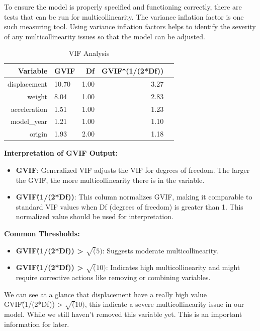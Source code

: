To ensure the model is properly specified and functioning correctly, there are tests that can be run for multicollinearity. The variance inflation factor is one such measuring tool. Using variance inflation factors helps to identify the severity of any multicollinearity issues so that the model can be adjusted.

\begin{table}[H]
\centering
\begin{tabular}{rlrrr}
  \hline
 Variable & GVIF & Df & GVIF\verb|^|(1/(2*Df)) \\ 
  \hline
displacement & 10.70 & 1.00 & 3.27 \\ 
weight & 8.04 & 1.00 & 2.83 \\ 
 acceleration & 1.51 & 1.00 & 1.23 \\ 
 model\_year & 1.21 & 1.00 & 1.10 \\ 
 origin & 1.93 & 2.00 & 1.18 \\ 
   \hline
\end{tabular}
\caption{VIF Analysis} 
\label{tab:vif}
\end{table}


\textbf{Interpretation of GVIF Output:}

\begin{itemize}
    \item \textbf{GVIF}: Generalized VIF adjusts the VIF for degrees of freedom. The larger the GVIF, the more multicollinearity there is in the variable.
    \item \textbf{GVIF\^(1/(2*Df))}: This column normalizes GVIF, making it comparable to standard VIF values when Df (degrees of freedom) is greater than 1. This normalized value should be used for interpretation.
\end{itemize}
 
\textbf{Common Thresholds:}

\begin{itemize}
    \item \textbf{GVIF\^(1/(2*Df)) > $\sqrt(5)$}: Suggests moderate multicollinearity.
    \item \textbf{GVIF\^(1/(2*Df)) > $\sqrt(10)$}: Indicates high multicollinearity and might require corrective actions like removing or combining variables.
\end{itemize}

We can see at a glance that displacement have a really high value GVIF\^(1/(2*Df)) > $\sqrt(10)$, this indicate a severe multicollinearity issue in our model. While we still haven't removed this variable yet. This is an important information for later. 


